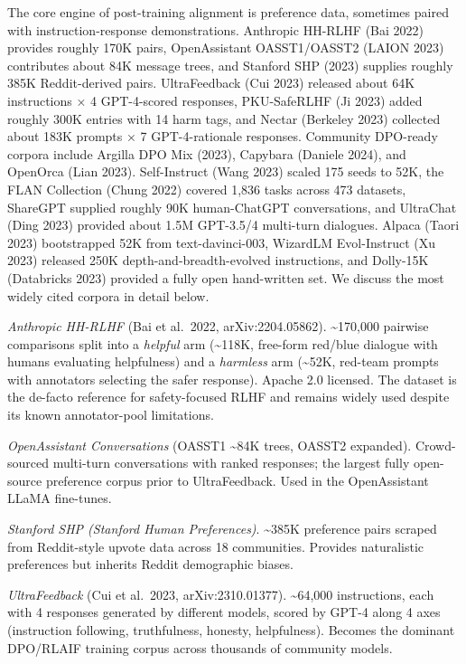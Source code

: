 The core engine of post-training alignment is preference data, sometimes paired with instruction-response demonstrations. Anthropic HH-RLHF (Bai 2022) provides roughly 170K pairs, OpenAssistant OASST1/OASST2 (LAION 2023) contributes about 84K message trees, and Stanford SHP (2023) supplies roughly 385K Reddit-derived pairs. UltraFeedback (Cui 2023) released about 64K instructions × 4 GPT-4-scored responses, PKU-SafeRLHF (Ji 2023) added roughly 300K entries with 14 harm tags, and Nectar (Berkeley 2023) collected about 183K prompts × 7 GPT-4-rationale responses. Community DPO-ready corpora include Argilla DPO Mix (2023), Capybara (Daniele 2024), and OpenOrca (Lian 2023). Self-Instruct (Wang 2023) scaled 175 seeds to 52K, the FLAN Collection (Chung 2022) covered 1,836 tasks across 473 datasets, ShareGPT supplied roughly 90K human-ChatGPT conversations, and UltraChat (Ding 2023) provided about 1.5M GPT-3.5/4 multi-turn dialogues. Alpaca (Taori 2023) bootstrapped 52K from text-davinci-003, WizardLM Evol-Instruct (Xu 2023) released 250K depth-and-breadth-evolved instructions, and Dolly-15K (Databricks 2023) provided a fully open hand-written set. We discuss the most widely cited corpora in detail below.

\emph{Anthropic HH-RLHF} (Bai et al.~2022, arXiv:2204.05862). \textasciitilde170,000 pairwise comparisons split into a \emph{helpful} arm (\textasciitilde118K, free-form red/blue dialogue with humans evaluating helpfulness) and a \emph{harmless} arm (\textasciitilde52K, red-team prompts with annotators selecting the safer response). Apache 2.0 licensed. The dataset is the de-facto reference for safety-focused RLHF and remains widely used despite its known annotator-pool limitations.

\emph{OpenAssistant Conversations} (OASST1 \textasciitilde84K trees, OASST2 expanded). Crowd-sourced multi-turn conversations with ranked responses; the largest fully open-source preference corpus prior to UltraFeedback. Used in the OpenAssistant LLaMA fine-tunes.

\emph{Stanford SHP (Stanford Human Preferences)}. \textasciitilde385K preference pairs scraped from Reddit-style upvote data across 18 communities. Provides naturalistic preferences but inherits Reddit demographic biases.

\emph{UltraFeedback} (Cui et al.~2023, arXiv:2310.01377). \textasciitilde64,000 instructions, each with 4 responses generated by different models, scored by GPT-4 along 4 axes (instruction following, truthfulness, honesty, helpfulness). Becomes the dominant DPO/RLAIF training corpus across thousands of community models.

